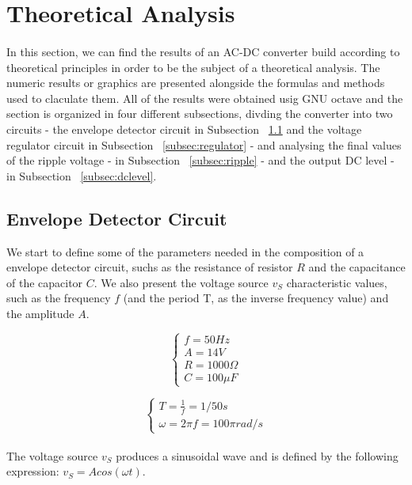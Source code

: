 \section{Theoretical Analysis}
\label{sec:analysis}

\paragraph{}
In this section, we can find the results of an AC-DC converter build according to theoretical principles in order to be the subject of a theoretical analysis. The numeric results or graphics are presented alongside the formulas and methods used to claculate them. All of the results were obtained usig GNU octave and the section is organized in four different subsections, divding the converter into two circuits - the envelope detector circuit in Subsection ~\ref{subsec:envelope} and the voltage regulator circuit in Subsection ~\ref{subsec:regulator} - and analysing the final values of the ripple voltage - in Subsection ~\ref{subsec:ripple} - and the output DC level - in Subsection ~\ref{subsec:dclevel}.



\subsection{Envelope Detector Circuit}
\label{subsec:envelope}

We start to define some of the parameters needed in the composition of a envelope detector circuit, suchs as the resistance of resistor $R$ and the capacitance of the capacitor $C$. We also present the voltage source $v_S$ characteristic values, such as the frequency $f$ (and the period T, as the inverse frequency value) and the amplitude $A$.

\[
\left\{\begin{matrix}
f = 50 Hz\\
A= 14 V\\
R= 1000 \Omega\\
C=100 \mu F
\end{matrix}\right.
\]

\[
\left\{\begin{matrix}
T = \frac{1}{f} = 1/50 s\\
\omega = 2 \pi f = 100 \pi rad/s
\end{matrix}\right.
\]

\paragraph{}
The voltage source $v_S$ produces a sinusoidal wave and is defined by the following expression: $v_S=Acos(\omega t)$.

